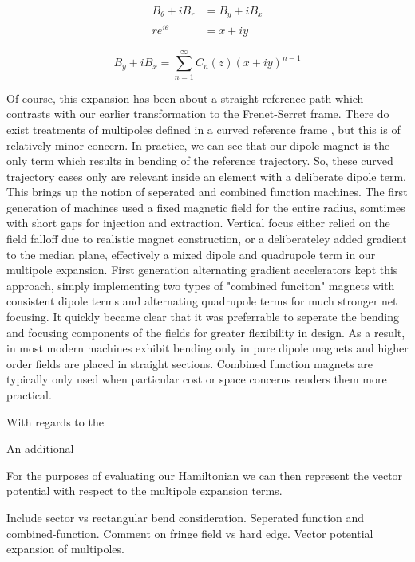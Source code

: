 \begin{equation} \label{eq:cylToCart}
\begin{split}
	B_{\theta} + i B_r &= B_y + i B_x\\
	r e^{i\theta} &= x + iy
\end{split}
\end{equation}

\begin{equation} \label{eq:bethCart}
	B_y + iB_x = \sum_{n=1}^{\infty} C_n(z) (x + iy)^{n-1}
\end{equation}

Of course, this expansion has been about a straight reference path which contrasts with our earlier transformation to the Frenet-Serret frame. There do exist treatments of multipoles defined in a curved reference frame \cite{ZolkinMultipole}, but this is of relatively minor concern. In practice, we can see that our dipole magnet is the only term which results in bending of the reference trajectory. So, these curved trajectory cases only are relevant inside an element with a deliberate dipole term. This brings up the notion of seperated and combined function machines. The first generation of machines used a fixed magnetic field for the entire radius, somtimes with short gaps for injection and extraction. Vertical focus either relied on the field falloff due to realistic magnet construction, or a deliberateley added gradient to the median plane, effectively a mixed dipole and quadrupole term in our multipole expansion. First generation alternating gradient accelerators kept this approach, simply implementing two types of "combined funciton" magnets with consistent dipole terms and alternating quadrupole terms for much stronger net focusing. It quickly became clear that it was preferrable to seperate the bending and focusing components of the fields for greater flexibility in design. As a result, in most modern machines exhibit bending only in pure dipole magnets and higher order fields are placed in straight sections. Combined function magnets are typically only used when particular cost or space concerns renders them more practical.

With regards to the 

An additional 

For the purposes of evaluating our Hamiltonian we can then represent the vector potential with respect to the multipole expansion terms.

Include sector vs rectangular bend consideration.
Seperated function and combined-function.
Comment on fringe field vs hard edge.
Vector potential expansion of multipoles.

